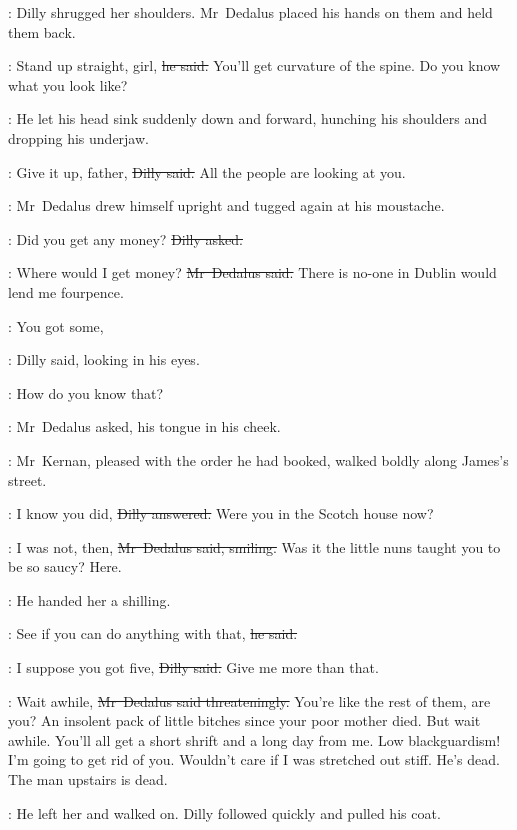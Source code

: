 :
Dilly shrugged her shoulders.
Mr~Dedalus placed his hands on them
and held them back.

\simon:
Stand up straight, girl,
\sout{he said.}
You'll get curvature of the spine.
Do you know what you look like?

:
He let his head sink suddenly down and forward,
hunching his shoulders and dropping his underjaw.

\dilly:
Give it up, father,
\sout{Dilly said.}
All the people are looking at you.

:
Mr~Dedalus drew himself upright
and tugged again at his moustache.

\dilly:
Did you get any money?
\sout{Dilly asked.}

\simon:
Where would I get money?
\sout{Mr~Dedalus said.}
There is no-one in Dublin would lend me fourpence.%

\dilly:
You got some,

:
Dilly said,
looking in his eyes.

\simon:
How do you know that?

:
Mr~Dedalus asked,
his tongue in his cheek.

\begin{interject}
    :
    Mr~Kernan,
    pleased with the order he had booked,
    walked boldly along James's street.
\end{interject}

\dilly:
I know you did,
\sout{Dilly answered.}
Were you in the Scotch house now?

\simon:
I was not, then,
\sout{Mr~Dedalus said, smiling.}
Was it the little nuns taught you to be so saucy?
Here.

:
He handed her a shilling.

\simon:
See if you can do anything with that,
\sout{he said.}

\dilly:
I suppose you got five,
\sout{Dilly said.}%
Give me more than that.

\simon:
Wait awhile,
\sout{Mr~Dedalus said threateningly.}
You're like the rest of them, are you?
An insolent pack of little bitches since your poor mother died.
But wait awhile.
You'll all get a short shrift and a long day from me.
Low blackguardism!
I'm going to get rid of you.
Wouldn't care if I was stretched out stiff.
He's dead.
The man upstairs is dead.

:
He left her and walked on.
Dilly followed quickly and pulled his coat.

